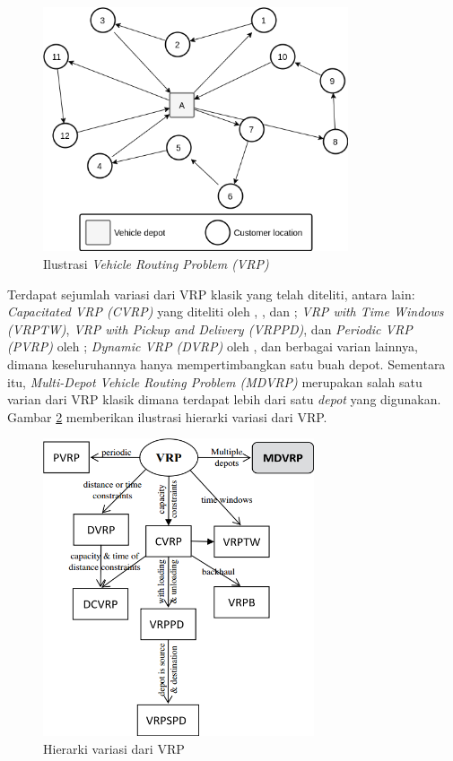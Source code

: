 \begin{figure}[!]
	\centering
	\includegraphics[width=9cm]{Resources/Images/vrp-ilustration}
	\captionsetup{format=hang}
	\caption{Ilustrasi \textit{Vehicle Routing Problem (VRP)}}
	\label{fig:vrp-ilustration}
\end{figure}


Terdapat sejumlah variasi dari VRP klasik yang telah diteliti, antara lain: \textit{Capacitated VRP (CVRP)} yang diteliti oleh \citep{baldacci_exact_2010}, \citep{cordeau_chapter_2007}, dan \citep{toth_vehicle_2002}; \textit{VRP with Time Windows (VRPTW)}, \textit{VRP with Pickup and Delivery (VRPPD)}, dan \textit{Periodic VRP (PVRP)} oleh \citep{solomon_survey_1988}; \textit{Dynamic VRP (DVRP)} oleh \citep{psaraftis_dynamic_1995}, dan berbagai varian lainnya, dimana keseluruhannya hanya mempertimbangkan satu buah depot. Sementara itu, \textit{Multi-Depot Vehicle Routing Problem (MDVRP)} merupakan salah satu varian dari VRP klasik dimana terdapat lebih dari satu \textit{depot} yang digunakan. Gambar \ref{fig:vrp-variants} memberikan ilustrasi hierarki variasi dari VRP.


\begin{figure}[!]
	\centering
	\includegraphics[width=8cm]{Resources/Images/vrp-variants}
	\captionsetup{format=hang}
	\caption{Hierarki variasi dari VRP \citep{weise_solving_2009}}
	\label{fig:vrp-variants}
\end{figure}


